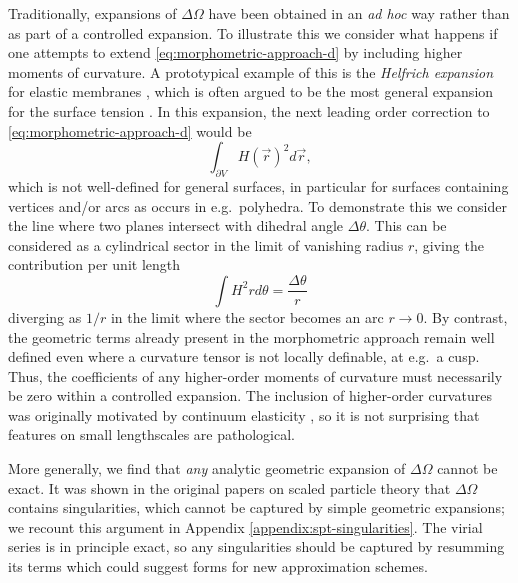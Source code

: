 \documentclass[11pt,twoside]{report}
\begin{document}
Traditionally, expansions of $\Delta \Omega$ have been obtained in an \emph{ad hoc} way rather than as part of a controlled expansion.
To illustrate this we consider what happens if one attempts to extend \eqref{eq:morphometric-approach-d} by including higher moments of curvature.
A prototypical example of this is the \emph{Helfrich expansion} for elastic membranes \cite{HelfrichZFNC1973}, which is often argued to be the most general expansion for the surface tension \cite{BlokhuisPRE2013}.
In this expansion, the next leading order correction to \eqref{eq:morphometric-approach-d} would be%
\begin{equation*}
  \int_{\partial V} H(\vec{r})^2 d\vec{r},
\end{equation*}
which is not well-defined for general surfaces, in particular for surfaces containing vertices and/or arcs as occurs in e.g.\ polyhedra.
To demonstrate this we consider the line where two planes intersect with dihedral angle $\Delta \theta$.
This can be considered as a cylindrical sector in the limit of vanishing radius $r$, giving the contribution per unit length
\begin{equation*}
  \int H^2 r d\theta
  = \frac{\Delta \theta}{r}
\end{equation*}
diverging as $1 / r$ in the limit where the sector becomes an arc $r \to 0$.
By contrast, the geometric terms already present in the morphometric approach remain well defined even where a curvature tensor is not locally definable, at e.g.\ a cusp.
Thus, the coefficients of any higher-order moments of curvature must necessarily be zero within a controlled expansion.
The inclusion of higher-order curvatures was originally motivated by continuum elasticity \cite{HelfrichZFNC1973}, so it is not surprising that features on small lengthscales are pathological.

More generally, we find that \emph{any} analytic geometric expansion of $\Delta \Omega$ cannot be exact.
It was shown in the original papers on scaled particle theory \cite{ReissJCP1959,ReissJCP1960} that $\Delta \Omega$ contains singularities, which cannot be captured by simple geometric expansions; we recount this argument in Appendix \ref{appendix:spt-singularities}.
The virial series is in principle exact, so any singularities should be captured by resumming its terms which could suggest forms for new approximation schemes.
\end{document}
